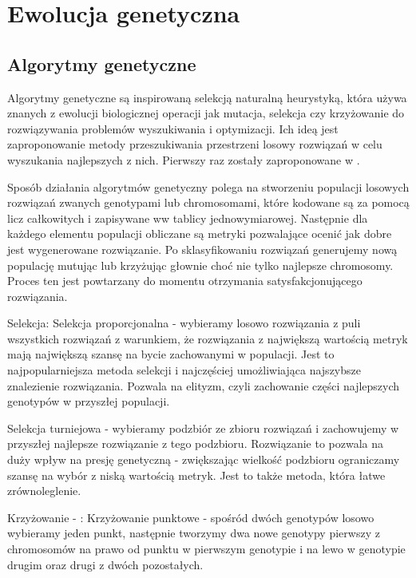 
\section{Ewolucja genetyczna}
\label{sec:ewolucjaGenetyczne}
\subsection{Algorytmy genetyczne}
\cite{ryan_collins_neill_1998}
Algorytmy genetyczne są inspirowaną selekcją naturalną  heurystyką, która używa znanych z ewolucji biologicznej operacji jak mutacja, selekcja czy krzyżowanie do rozwiązywania problemów wyszukiwania i optymizacji. Ich ideą jest zaproponowanie metody przeszukiwania przestrzeni losowy rozwiązań w celu wyszukania najlepszych z nich. Pierwszy raz zostały zaproponowane w \cite{10.5555/138936}.

Sposób działania algorytmów genetyczny polega na stworzeniu populacji losowych rozwiązań zwanych genotypami lub chromosomami, które kodowane są za pomocą licz całkowitych i zapisywane ww tablicy jednowymiarowej. Następnie dla każdego elementu populacji obliczane są metryki pozwalające ocenić jak dobre jest wygenerowane rozwiązanie. Po sklasyfikowaniu rozwiązań generujemy nową populację mutując lub krzyżując głownie choć nie tylko najlepsze chromosomy. Proces ten jest powtarzany do momentu otrzymania satysfakcjonującego rozwiązania.  

Selekcja:
Selekcja proporcjonalna - wybieramy losowo rozwiązania z puli wszystkich rozwiązań z warunkiem, że rozwiązania z największą wartością metryk mają największą szansę na bycie zachowanymi w populacji. Jest to najpopularniejsza metoda selekcji i najczęściej umożliwiająca najszybsze znalezienie rozwiązania. Pozwala na elityzm, czyli zachowanie części najlepszych genotypów w przyszłej populacji.

Selekcja turniejowa - wybieramy podzbiór ze zbioru rozwiązań i zachowujemy w przyszłej najlepsze rozwiązanie z tego podzbioru.
Rozwiązanie to pozwala na duży wpływ na presję genetyczną - zwiększając wielkość podzbioru ograniczamy szansę na wybór z niską wartością metryk.  Jest to także metoda, która łatwe zrównoleglenie.

Krzyżowanie - :
Krzyżowanie punktowe - spośród dwóch genotypów losowo wybieramy jeden punkt, następnie tworzymy dwa nowe genotypy pierwszy z chromosomów na prawo od punktu w pierwszym genotypie i na lewo w genotypie drugim oraz drugi z dwóch pozostałych.

